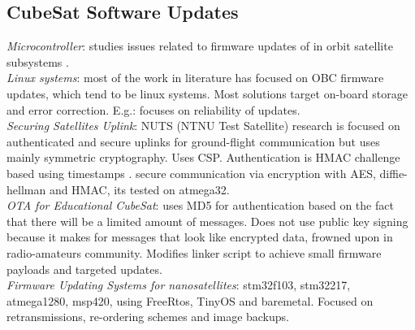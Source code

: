 \subsection{CubeSat Software Updates}
\label{sec:fu-cubesat}
\textit{Microcontroller}: studies issues related to firmware updates of in orbit
satellite subsystems \cite{sunter2016updatesnano}.\\
\textit{Linux systems}: most of the work in literature has focused on OBC firmware
updates, which tend to be linux systems. Most solutions target on-board storage
and error correction. E.g.: \cite{FitzsimmonsReliableSoftwareUpdates} focuses on
reliability of updates.\\
\textit{Securing Satellites Uplink}: NUTS (NTNU Test Satellite)\cite{birkeland2014nutsoverview}
research is focused on authenticated and secure uplinks for ground-flight communication but
uses mainly symmetric cryptography. Uses CSP. Authentication is HMAC challenge
\cite{Muench2014IntegrationAV} based using timestamps \cite{bezem2013nutsAuthenticatedUplink}.
\cite{yasir2021EncryptioUnitSat} secure communication via encryption with AES, diffie-hellman
and HMAC, its tested on atmega32.\\
\textit{OTA for Educational CubeSat}\cite{maison2021otaeducubesat}: uses MD5 for
authentication based on the fact that there will be a limited amount of messages.
Does not use public key signing because it makes for messages that look like encrypted
data, frowned upon in radio-amateurs community. Modifies linker script to achieve
small firmware payloads and targeted updates.\\
\textit{Firmware Updating Systems for nanosatellites}\cite{sunter2016updatesnano}:
stm32f103, stm32217, atmega1280, msp420, using FreeRtos, TinyOS and baremetal. Focused
on retransmissions, re-ordering schemes and image backups.\\

